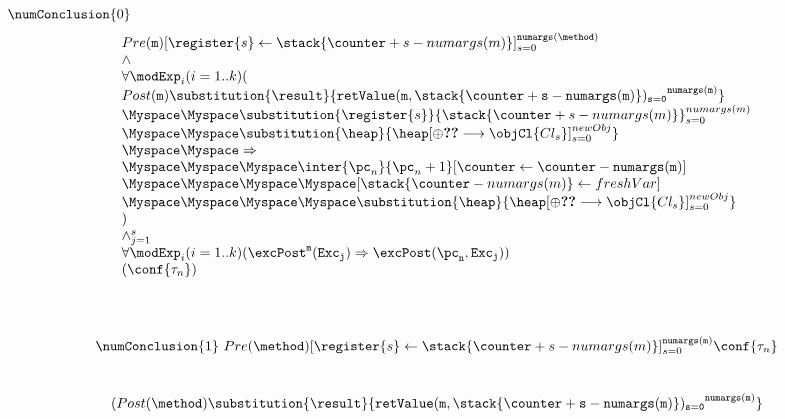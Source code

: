 \begin{enumerate}
\begin{enumerate}
			$\numConclusion{0}   $
			$$ 
	 		\begin{array}{l}
	 			Pre( \texttt{m})[ \register{s} \leftarrow \stack{\counter + s - numargs(m)}]_{s = 0}^{\tt{numargs(\method) }}  \\
	 			\wedge \\
	 			\forall  \modExp_i ( i =1 .. k  )(  \\ 
	 			Post( \texttt{m} )\substitution{\result}{\tt{retValue(m,\stack{\counter + s - numargs(m) })_{s=0} }^{numargs(m) } }\\
	 			\Myspace \Myspace \substitution{ \register{s}}{ \stack{\counter + s - numargs(m)}}_{s = 0}^{numargs(m)} \\	 				 					\Myspace \Myspace \substitution{\heap}{\heap[\oplus \Ref{Cl_s} \longrightarrow \objCl{Cl_s }]_{s=0}^{newObj} } \\
	 			\Myspace \Myspace \Rightarrow \\  
	 			\Myspace \Myspace \Myspace  \inter{\pc_n}{\pc_n + 1 } [\counter \leftarrow \counter -  \tt{numargs(m)}   ] \\ 
				\Myspace \Myspace \Myspace \Myspace   [  \stack{\counter -  numargs(m)   } \leftarrow freshVar ] \\
				\Myspace \Myspace \Myspace \Myspace   \substitution{\heap}{\heap[\oplus \Ref{Cl_s} \longrightarrow \objCl{Cl_s }]_{s=0}^{newObj} } 	\\										) \\
	 			\wedge_{j = 1}^s \\
	 			\forall \modExp_i ( i =1 .. k  ) ( \excPost^{\tt{m} }( \tt{Exc_j} ) \Rightarrow \excPost(\pc_n, \tt{Exc_j} ) ) \\											(\conf{\state{n}})
	 		\end{array} 
	 		$$ \\
		 \\
		$$ \numConclusion{1} \	Pre( \method )[ \register{s} \leftarrow \stack{\counter + s - numargs(m)}]_{s = 0}^{\tt{numargs(m)} }\conf{\state{n}}  $$
		 \\
		$$ \begin{array}{l}
		 (Post(\method)\substitution{ \result }{ \tt{retValue(m,\stack{\counter + s - numargs(m) })_{s=0} }^{\tt{numargs(m)}}  } \\

\end{array}$$
\end{enumerate}
\end{enumerate}
